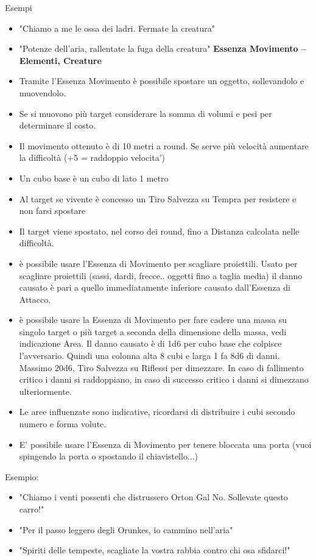 \documentclass[a4paper,11pt,twoside,openany]{book}
\begin{document}
Esempi
\begin{itemize}
	\item
	      "Chiamo a me le ossa dei ladri. Fermate la creatura"
	\item
	      "Potenze dell'aria, rallentate la fuga della creatura"
	      \textbf{Essenza Movimento -- Elementi, Creature}
	\item
	      Tramite l'Essenza Movimento è possibile spostare un oggetto, sollevandolo e muovendolo.
	\item
	      Se si muovono più target considerare la somma di volumi e pesi per determinare il costo.
	\item
	      Il movimento ottenuto è di 10 metri a round. Se serve più velocità aumentare la difficoltà (+5 = raddoppio velocita')
	\item
	      Un cubo base è un cubo di lato 1 metro
	\item
	      Al target se vivente è concesso un Tiro Salvezza su Tempra per resistere e non farsi spostare
	\item
	      Il target viene spostato, nel corso dei round, fino a Distanza calcolata nelle difficoltà.
	\item
	      è possibile usare l'Essenza di Movimento per scagliare proiettili. Usato per scagliare proiettili (sassi, dardi, frecce.. oggetti fino a taglia media) il danno causato è pari a quello immediatamente inferiore causato dall'Essenza di Attacco.
	\item
	      è possibile usare la Essenza di Movimento per fare cadere una massa su singolo target o più target a seconda della dimensione della massa, vedi indicazione Area. Il danno causato è di 1d6 per cubo base che colpisce l'avversario. Quindi una colonna alta 8 cubi e larga 1 fa 8d6 di danni. Massimo 20d6, Tiro Salvezza su Riflessi per dimezzare. In caso di fallimento critico i danni si raddoppiano, in caso di successo critico i danni si dimezzano ulteriormente.
	\item
	      Le aree influenzate sono indicative, ricordarsi di distribuire i cubi secondo numero e forma volute.
	      
	\item E' possibile usare l'Essenza di Movimento per tenere bloccata una porta (vuoi spingendo la porta o spostando il chiavistello...)
	
\end{itemize}
\bigskip


Esempio:
\begin{itemize}
	\item
	      "Chiamo i venti possenti che distrussero Orton Gal No. Sollevate questo carro!"
	\item
	      "Per il passo leggero degli Orunkes, io cammino nell'aria"
	\item
	      "Spiriti delle tempeste, scagliate la vostra rabbia contro chi osa sfidarci!"
\end{itemize}
\end{document}
